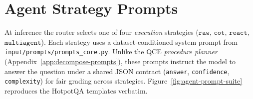 \section{Agent Strategy Prompts}
\label{app:agent-prompts}

At inference the router selects one of four \emph{execution} strategies
($\texttt{raw}$, $\texttt{cot}$, $\texttt{react}$, $\texttt{multiagent}$).
Each strategy uses a dataset-conditioned system prompt from
\texttt{input/prompts/prompts\_core.py}.
Unlike the QCE \emph{procedure planner} (Appendix~\ref{app:decompose-prompts}), these prompts
instruct the model to answer the question under a shared JSON contract
(\texttt{answer}, \texttt{confidence}, \texttt{complexity}) for fair grading across strategies.
Figure~\ref{fig:agent-prompt-suite} reproduces the HotpotQA templates verbatim.


\clearpage
